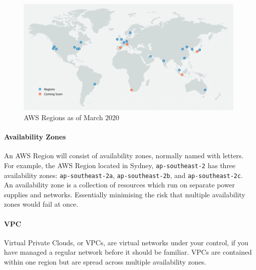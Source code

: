 \documentclass{csse4400}
\begin{document}
\begin{figure}[ht]
\includegraphics[width=\textwidth]{images/aws_regions}
\caption{AWS Regions as of March 2020 \cite{aws-regions}}
\end{figure}

\paragraph{Availability Zones}
An AWS Region will consist of availability zones, normally named with letters.
For example, the AWS Region located in Sydney, \texttt{ap-southeast-2} has three availability zones:
\texttt{ap-southeast-2a}, \texttt{ap-southeast-2b}, and \texttt{ap-southeast-2c}.
An availability zone is a collection of resources which run on separate power supplies and networks.
Essentially minimising the risk that multiple availability zones would fail at once.

\paragraph{VPC}
Virtual Private Clouds, or VPCs,
are virtual networks under your control,
if you have managed a regular network before it should be familiar.
VPCs are contained within one region but are spread across multiple availability zones.
\end{document}
